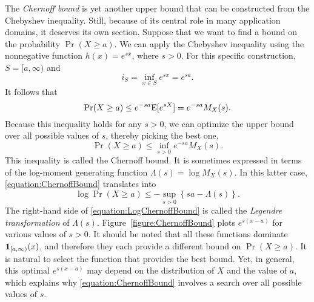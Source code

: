The \emph{Chernoff bound} is yet another upper bound that can be constructed from the Chebyshev inequality. 
Still, because of its central role in many application domains, it deserves its own section.
Suppose that we want to find a bound on the probability $\Pr (X \geq a)$.
We can apply the Chebyshev inequality using the nonnegative function $h(x) = e^{sx}$, where $s > 0$.
For this specific construction, $S = [a, \infty)$ and
\begin{equation*}
i_S = \inf_{x \in S} e^{sx} = e^{sa} .
\end{equation*}
It follows that
\begin{equation*}
\Pr (X \geq a) \leq e^{-sa} \mathrm{E}[ e^{sX} ] = e^{-sa} M_X(s) .
\end{equation*}
Because this inequality holds for any $s > 0$, we can optimize the upper bound over all possible values of $s$, thereby picking the best one,
\begin{equation} \label{equation:ChernoffBound}
\Pr (X \geq a) \leq \inf_{s > 0} e^{-sa} M_X(s) .
\end{equation}
This inequality is called the Chernoff bound.
It is sometimes expressed in terms of the log-moment generating function $\Lambda (s) = \log M_X (s)$.
In this latter case, \eqref{equation:ChernoffBound} translates into
\begin{equation} \label{equation:LogChernoffBound}
\log \Pr (X \geq a) \leq - \sup_{s > 0} \left\{ sa - \Lambda (s) \right\} .
\end{equation}
The right-hand side of \eqref{equation:LogChernoffBound} is called the \emph{Legendre transformation} of $\Lambda (s)$. 
Figure~\ref{figure:ChernoffBound} plots $e^{s(x-a)}$ for various values of $s > 0$.
It should be noted that all these functions dominate $\mathbf{1}_{[a, \infty)}(x)$, and therefore they each provide a different bound on $\Pr (X \geq a)$.
It is natural to select the function that provides the best bound.
Yet, in general, this optimal $e^{s(x-a)}$ may depend on the distribution of $X$ and the value of $a$, which explains why \eqref{equation:ChernoffBound} involves a search over all possible values of $s$.

